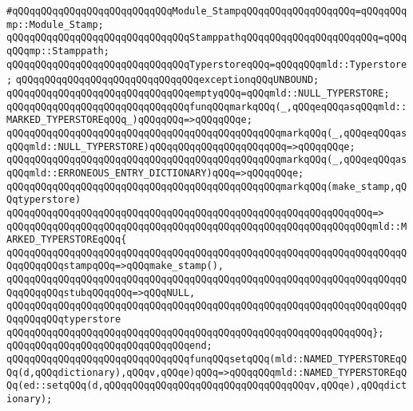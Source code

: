 \newline
\verb|#qQQqqQQqqQQqqQQqqQQqqQQqqQQqModule_StampqQQqqQQqqQQqqQQqqQQq=qQQqqQQqmp::Module_Stamp;|\newline
\verb|qQQqqQQqqQQqqQQqqQQqqQQqqQQqqQQqStamppathqQQqqQQqqQQqqQQqqQQqqQQq=qQQqqQQqmp::Stamppath;|\newline
\verb|qQQqqQQqqQQqqQQqqQQqqQQqqQQqqQQqTyperstoreqQQq=qQQqqQQqmld::Typerstore;|\newline
\newline
\verb|qQQqqQQqqQQqqQQqqQQqqQQqqQQqqQQqexceptionqQQqUNBOUND;|\newline
\newline
\verb|qQQqqQQqqQQqqQQqqQQqqQQqqQQqqQQqemptyqQQq=qQQqmld::NULL_TYPERSTORE;|\newline
\newline
\verb|qQQqqQQqqQQqqQQqqQQqqQQqqQQqqQQqfunqQQqmarkqQQq(_,qQQqeqQQqasqQQqmld::MARKED_TYPERSTOREqQQq_)qQQqqQQq=>qQQqqQQqe;|\newline
\verb|qQQqqQQqqQQqqQQqqQQqqQQqqQQqqQQqqQQqqQQqqQQqqQQqmarkqQQq(_,qQQqeqQQqasqQQqmld::NULL_TYPERSTORE)qQQqqQQqqQQqqQQqqQQqqQQq=>qQQqqQQqe;|\newline
\verb|qQQqqQQqqQQqqQQqqQQqqQQqqQQqqQQqqQQqqQQqqQQqqQQqmarkqQQq(_,qQQqeqQQqasqQQqmld::ERRONEOUS_ENTRY_DICTIONARY)qQQq=>qQQqqQQqe;|\newline
\newline
\verb|qQQqqQQqqQQqqQQqqQQqqQQqqQQqqQQqqQQqqQQqqQQqqQQqmarkqQQq(make_stamp,qQQqtyperstore)|\newline
\verb|qQQqqQQqqQQqqQQqqQQqqQQqqQQqqQQqqQQqqQQqqQQqqQQqqQQqqQQqqQQqqQQq=>|\newline
\verb|qQQqqQQqqQQqqQQqqQQqqQQqqQQqqQQqqQQqqQQqqQQqqQQqqQQqqQQqqQQqqQQqmld::MARKED_TYPERSTOREqQQq{|\newline
\verb|qQQqqQQqqQQqqQQqqQQqqQQqqQQqqQQqqQQqqQQqqQQqqQQqqQQqqQQqqQQqqQQqqQQqqQQqqQQqqQQqstampqQQq=>qQQqmake_stamp(),|\newline
\verb|qQQqqQQqqQQqqQQqqQQqqQQqqQQqqQQqqQQqqQQqqQQqqQQqqQQqqQQqqQQqqQQqqQQqqQQqqQQqqQQqstubqQQqqQQq=>qQQqNULL,|\newline
\verb|qQQqqQQqqQQqqQQqqQQqqQQqqQQqqQQqqQQqqQQqqQQqqQQqqQQqqQQqqQQqqQQqqQQqqQQqqQQqqQQqtyperstore|\newline
\verb|qQQqqQQqqQQqqQQqqQQqqQQqqQQqqQQqqQQqqQQqqQQqqQQqqQQqqQQqqQQqqQQq};|\newline
\verb|qQQqqQQqqQQqqQQqqQQqqQQqqQQqqQQqend;|\newline
\newline
\verb|qQQqqQQqqQQqqQQqqQQqqQQqqQQqqQQqfunqQQqsetqQQq(mld::NAMED_TYPERSTOREqQQq(d,qQQqdictionary),qQQqv,qQQqe)qQQq=>qQQqqQQqmld::NAMED_TYPERSTOREqQQq(ed::setqQQq(d,qQQqqQQqqQQqqQQqqQQqqQQqqQQqqQQqqQQqv,qQQqe),qQQqdictionary);|\newline
